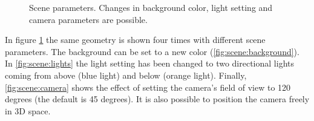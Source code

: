 \documentclass[appendixprefix,a4paper]{scrreprt}
\begin{document}
\begin{figure}
\centering
{}
\caption[Scene parameters]{Scene parameters. Changes in 
 background color,  
light setting and  camera parameters are possible.}
\label{fig:scene}
\end{figure}

In figure \ref{fig:scene} the same geometry is shown four times with different 
scene parameters. The background can be set to a new color 
(\ref{fig:scene:background}). In \ref{fig:scene:lights} the light setting has 
been changed to two directional lights coming from above (blue light) and 
below (orange light). Finally, \ref{fig:scene:camera} shows the effect of 
setting the camera's field of view to 120 degrees (the default is 45 
degrees). It is also possible to position the camera freely in 3D space.
\end{document}
